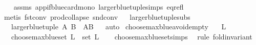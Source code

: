 \begin{isabellebody}
%
\isadelimproof
\ \ %
\endisadelimproof
%
\isatagproof
{}\isamarkupfalse%
\ assms\ app{\isacharunderscore}{\kern0pt}if{\isacharunderscore}{\kern0pt}blue{\isacharunderscore}{\kern0pt}card{\isacharunderscore}{\kern0pt}mono\ larger{\isacharunderscore}{\kern0pt}blue{\isacharunderscore}{\kern0pt}tuple{\isachardot}{\kern0pt}simps\ eq{\isacharunderscore}{\kern0pt}refl\isanewline
\ \ \isamarkupfalse%
\ {\isacharparenleft}{\kern0pt}metis\ fst{\isacharunderscore}{\kern0pt}conv\ prod{\isachardot}{\kern0pt}collapse\ snd{\isacharunderscore}{\kern0pt}conv{\isacharparenright}{\kern0pt}%
\endisatagproof
{\isafoldproof}%
%
\isadelimproof
\ \isanewline
%
\endisadelimproof
\isanewline
\isanewline
{}\isamarkupfalse%
\ larger{\isacharunderscore}{\kern0pt}blue{\isacharunderscore}{\kern0pt}tuple{\isacharunderscore}{\kern0pt}subs{\isacharcolon}{\kern0pt}\isanewline
\ \ \ {\isachardoublequoteopen}larger{\isacharunderscore}{\kern0pt}blue{\isacharunderscore}{\kern0pt}tuple\ A\ B\ {\isasymin}\ {\isacharbraceleft}{\kern0pt}A{\isacharcomma}{\kern0pt}B{\isacharbraceright}{\kern0pt}{\isachardoublequoteclose}%
\isadelimproof
\ %
\endisadelimproof
%
\isatagproof
{}\isamarkupfalse%
\ auto%
\endisatagproof
{\isafoldproof}%
%
\isadelimproof
%
\endisadelimproof
%
\isadelimdocument
%
\endisadelimdocument
%
\isatagdocument
%
\isamarkuptrue%
%
\endisatagdocument
{\isafolddocument}%
%
\isadelimdocument
%
\endisadelimdocument
{}\isamarkupfalse%
\ choose{\isacharunderscore}{\kern0pt}max{\isacharunderscore}{\kern0pt}blue{\isacharunderscore}{\kern0pt}avoid{\isacharunderscore}{\kern0pt}empty{\isacharcolon}{\kern0pt}\isanewline
\ \ \ {\isachardoublequoteopen}L\ {\isasymnoteq}\ {\isacharbrackleft}{\kern0pt}{\isacharbrackright}{\kern0pt}{\isachardoublequoteclose}\isanewline
\ \ \ {\isachardoublequoteopen}choose{\isacharunderscore}{\kern0pt}max{\isacharunderscore}{\kern0pt}blue{\isacharunderscore}{\kern0pt}set\ L\ {\isasymin}\ set\ L{\isachardoublequoteclose}\isanewline
%
\isadelimproof
\ \ %
\endisadelimproof
%
\isatagproof
{}\isamarkupfalse%
\ choose{\isacharunderscore}{\kern0pt}max{\isacharunderscore}{\kern0pt}blue{\isacharunderscore}{\kern0pt}set{\isachardot}{\kern0pt}simps\ \isanewline
{}\isamarkupfalse%
\ {\isacharparenleft}{\kern0pt}rule\ fold{\isacharunderscore}{\kern0pt}invariant{\isacharparenright}{\kern0pt}\isanewline
\ \ \ \ \isamarkupfalse%

\end{isabellebody}
